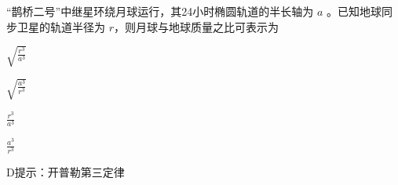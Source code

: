 “鹊桥二号”中继星环绕月球运行，其24小时椭圆轨道的半长轴为 \(a\) 。已知地球同步卫星的轨道半径为 \(r\)，则月球与地球质量之比可表示为\paren[]
\begin{choices}
	\item \(\sqrt{\frac{r^3}{a^3}}\)
	\item \(\sqrt{\frac{a^3}{r^3}}\)
	\item \(\frac{r^3}{a^3}\)
	\item \(\frac{a^3}{r^3}\)
\end{choices}
\begin{answer}
	D\qquad 提示：开普勒第三定律
\end{answer}